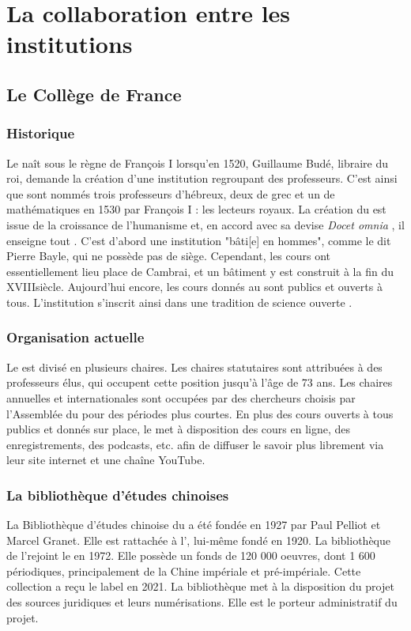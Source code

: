 \section{La collaboration entre les institutions}
    \subsection{Le Collège de France}

\subsubsection{Historique}
Le \cdf naît sous le règne de François I\ier{} lorsqu'en 1520, Guillaume Budé, libraire du roi, demande la création d'une institution regroupant des professeurs. C'est ainsi que sont nommés trois professeurs d'hébreux, deux de grec et un de mathématiques en 1530 par François I\ier{} : les lecteurs royaux. La création du \cdf est issue de la croissance de l'humanisme et, en accord avec sa devise \textit{\og Docet omnia \fg}, il enseigne \og tout \fg. C'est d'abord une institution "bâti[e] en hommes", comme le dit Pierre Bayle, qui ne possède pas de siège. Cependant, les cours ont essentiellement lieu place de Cambrai, et un bâtiment y est construit à la fin du XVIII\ieme siècle. Aujourd'hui encore, les cours donnés au \cdf sont publics et ouverts à tous. L'institution s'inscrit ainsi dans une tradition de \og science ouverte \fg. 

\subsubsection{Organisation actuelle}
Le \cdf est divisé en plusieurs chaires. Les chaires statutaires sont attribuées à des professeurs élus, qui occupent cette position jusqu'à l'âge de 73 ans. Les chaires annuelles et internationales sont occupées par des chercheurs choisis par l'Assemblée du \cdf pour des périodes plus courtes. En plus des cours ouverts à tous publics et donnés sur place, le \cdf met à disposition des cours en ligne, des enregistrements, des podcasts, etc. afin de diffuser le savoir plus librement via leur site internet et une chaîne YouTube. 

\subsubsection{La bibliothèque d'études chinoises}
La Bibliothèque d'études chinoise du \cdf a été fondée en 1927 par Paul Pelliot et Marcel Granet. Elle est rattachée à l'\IHEC, lui-même fondé en 1920. La bibliothèque de l'\IHEC rejoint le \cdf en 1972. Elle possède un fonds de 120 000 oeuvres, dont 1 600 périodiques, principalement de la Chine impériale et pré-impériale. Cette collection a reçu le label \CollEx en 2021. La bibliothèque met à la disposition du projet \COREL des sources juridiques et leurs numérisations. Elle est le porteur administratif du projet.

